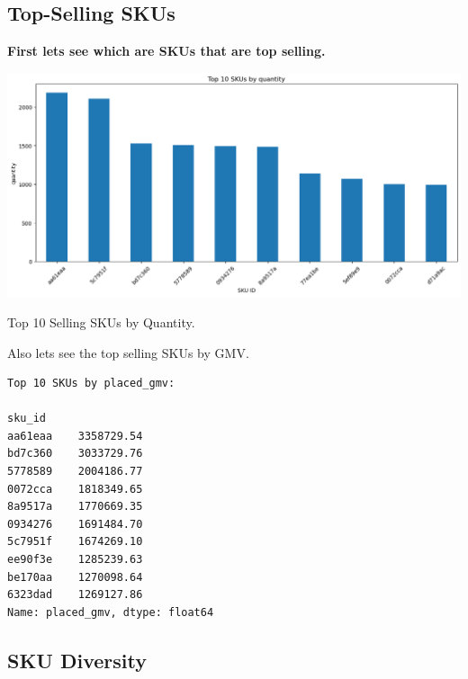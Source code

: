 \documentclass{article}
\begin{document}
    \subsection{Top-Selling SKUs}
    \textbf{First lets see which are SKUs that are top selling.}
    \begin{center}
        \includegraphics[width=1\columnwidth]{images/top-skus.png}
    \end{center}
    \caption{Top 10 Selling SKUs by Quantity.}
    \vspace{0.2in}
    Also lets see the top selling SKUs by GMV.{
       \begin{verbatim}
Top 10 SKUs by placed_gmv:

sku_id
aa61eaa    3358729.54
bd7c360    3033729.76
5778589    2004186.77
0072cca    1818349.65
8a9517a    1770669.35
0934276    1691484.70
5c7951f    1674269.10
ee90f3e    1285239.63
be170aa    1270098.64
6323dad    1269127.86
Name: placed_gmv, dtype: float64
       \end{verbatim}
    }
    
    \subsection{SKU Diversity}
    
\end{document}
